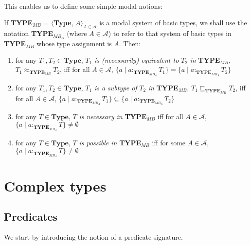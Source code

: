 This enables us to define some simple modal notions:

If {\bf TYPE$_{\mathit{MB}}$} = $\langle${\bf Type},
$A\rangle_{A\in\mathcal{A}}$
is a modal system of basic types, we shall use the notation {\bf
  TYPE$_{\mathit{MB}_A}$} (where $A\in\mathcal{A}$) to refer to that
system of basic types in {\bf TYPE$_{\mathit{MB}}$} whose type assignment is
$A$.    Then:  
\begin{enumerate} 
 
\item for any $T_1,T_2\in\textbf{Type}$, $T_1$ \textit{is
    (necessarily) equivalent
    to} $T_2$ \textit{in} {\bf TYPE$_{\mathit{MB}}$},
  $T_1\approx_{\mathbf{TYPE_{\mathit{MB}}}}T_2$,  iff for all
  $A\in\mathcal{A}$, $\{a\mid a:_{\mathbf{TYPE}_{\mathit{MB}_A}}T_1\}=\{a\mid a:_{\mathbf{TYPE}_{\mathit{MB}_A}}T_2\}$
  
 
\item for any $T_1,T_2\in\textbf{Type}$, $T_1$ \textit{is a subtype of} $T_2$ \textit{in} {\bf TYPE$_{\mathit{MB}}$},
  $T_1\sqsubseteq_{\mathbf{TYPE_{\mathit{MB}}}}T_2$,  iff for all
  $A\in\mathcal{A}$, $\{a\mid a:_{\mathbf{TYPE}_{\mathit{MB}_A}}T_1\}\subseteq\{a\mid a:_{\mathbf{TYPE}_{\mathit{MB}_A}}T_2\}$

\item for any $T\in\textbf{Type}$, $T$ \textit{is necessary in} {\bf TYPE$_{\mathit{MB}}$}  iff for all
  $A\in\mathcal{A}$, \\ $\{a\mid a:_{\mathbf{TYPE}_{\mathit{MB}_A}}T\}\not=\emptyset$

\item for any $T\in\textbf{Type}$, $T$ \textit{is possible in} {\bf TYPE$_{\mathit{MB}}$}  iff for some
  $A\in\mathcal{A}$, \\ $\{a\mid a:_{\mathbf{TYPE}_{\mathit{MB}_A}}T\}\not=\emptyset$
 
\end{enumerate}  

\section{Complex types}

\subsection{Predicates}
\label{app:predicates}
We start by introducing the notion of a predicate signature.

